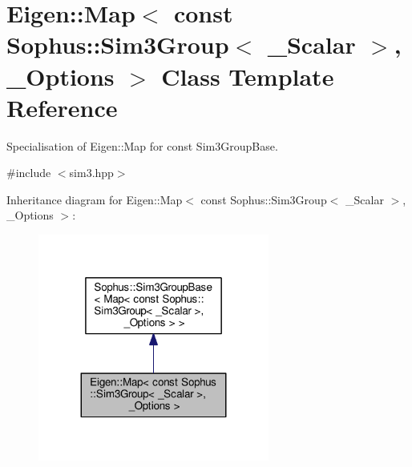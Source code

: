 \hypertarget{class_eigen_1_1_map_3_01const_01_sophus_1_1_sim3_group_3_01___scalar_01_4_00_01___options_01_4}{}\section{Eigen\+:\+:Map$<$ const Sophus\+:\+:Sim3\+Group$<$ \+\_\+\+Scalar $>$, \+\_\+\+Options $>$ Class Template Reference}
\label{class_eigen_1_1_map_3_01const_01_sophus_1_1_sim3_group_3_01___scalar_01_4_00_01___options_01_4}


Specialisation of Eigen\+::\+Map for const Sim3\+Group\+Base.  




{\ttfamily \#include $<$sim3.\+hpp$>$}



Inheritance diagram for Eigen\+:\+:Map$<$ const Sophus\+:\+:Sim3\+Group$<$ \+\_\+\+Scalar $>$, \+\_\+\+Options $>$\+:
\nopagebreak
\begin{figure}[H]
\begin{center}
\leavevmode
\includegraphics[width=215pt]{class_eigen_1_1_map_3_01const_01_sophus_1_1_sim3_group_3_01___scalar_01_4_00_01___options_01_4__inherit__graph}
\end{center}
\end{figure}


